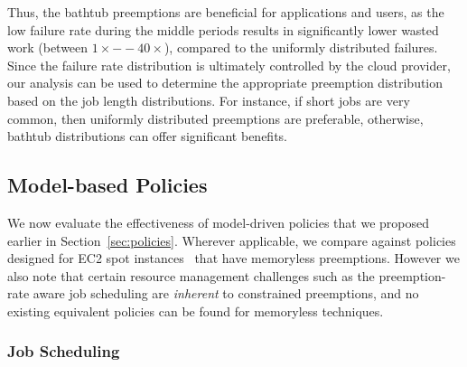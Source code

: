 Thus, the bathtub preemptions are beneficial for applications and users, as the low failure rate during the middle periods results in significantly lower wasted work (between $1\times--40\times$), compared to the uniformly distributed failures.
Since the failure rate distribution is ultimately controlled by the cloud provider, our analysis can be used to determine the appropriate preemption distribution based on the job length distributions.
For instance, if short jobs are very common, then uniformly distributed preemptions are preferable, otherwise, bathtub distributions can offer significant benefits. 

  



\vspace*{\subsecspace}
\subsection{Model-based Policies}
\label{subsec:eval-policy}

We now evaluate the effectiveness of model-driven policies that we proposed earlier in Section~\ref{sec:policies}.
%
Wherever applicable, we compare against policies designed for EC2 spot instances~\cite{harlap2018tributary, spoton} that have memoryless preemptions. 
%
However we also note that certain resource management challenges such as the preemption-rate aware job scheduling are \emph{inherent} to constrained preemptions, and no existing equivalent policies can be found for memoryless techniques. 




\vspace*{\subsecspace}
\subsubsection{Job Scheduling}

